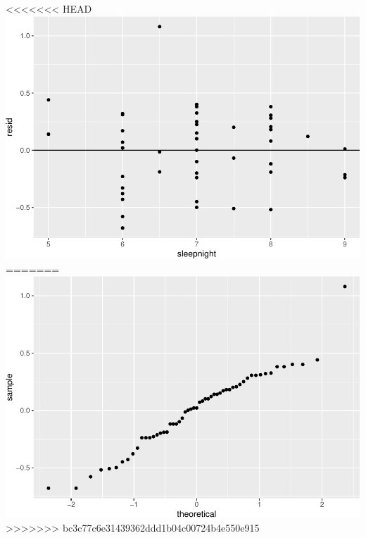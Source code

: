 \documentclass[]{article}
\newenvironment{Shaded}{\begin{snugshade}}{\end{snugshade}}
\newcommand{\DataTypeTok}[1]{\textcolor[rgb]{0.13,0.29,0.53}{#1}}
\newcommand{\DecValTok}[1]{\textcolor[rgb]{0.00,0.00,0.81}{#1}}
\newcommand{\KeywordTok}[1]{\textcolor[rgb]{0.13,0.29,0.53}{\textbf{#1}}}
\newcommand{\NormalTok}[1]{#1}
\newcommand{\OperatorTok}[1]{\textcolor[rgb]{0.81,0.36,0.00}{\textbf{#1}}}
\newcommand{\StringTok}[1]{\textcolor[rgb]{0.31,0.60,0.02}{#1}}
\begin{document}
<<<<<<< HEAD
\includegraphics{lab-8-regression_files/figure-latex/unnamed-chunk-8-1.pdf}
=======
\includegraphics{lab-8-regression_files/figure-latex/unnamed-chunk-9-1.pdf}
>>>>>>> bc3c77c6e31439362ddd1b04c00724b4e550e915

\begin{Shaded}
\end{Shaded}
\end{document}

